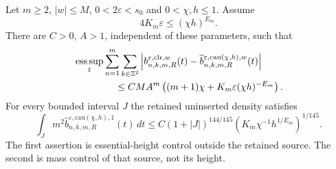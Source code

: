 \begin{theorem}
\label{thm:v63-positive-localization}
Let $m\ge2$, $|w|\le M$, $0<2\varepsilon<s_0$ and $0<\chi,h\le1$.
Assume
\begin{equation}\label{eq:v63-source-threshold}
 4K_m\varepsilon\le(\chi h)^{E_m}.
\end{equation}
There are $C>0$, $A>1$, independent of these parameters, such that
\begin{align}\label{eq:v63-height-outside}
 &\operatorname*{ess\,sup}_t\sum_{n=1}^m\sum_{k\in\Z^2}
 \left|b^{\varepsilon,\mathrm{clr},w}_{n,k,m,R}(t)
       -\widehat b^{\varepsilon,\mathrm{cau}(\chi,h),w}_{n,k,m,R}(t)\right|
 \notag\\
 &\hspace{15mm}\le CMA^m\left((m+1)\chi+
                  K_m\varepsilon(\chi h)^{-E_m}\right).
\end{align}
For every bounded interval $J$ the retained uninserted density satisfies
\begin{equation}\label{eq:v63-mass-inside}
 \int_J m^2\widehat b^{\varepsilon,\mathrm{cau}(\chi,h),1}_{n,k,m,R}(t)\,dt
 \le C(1+|J|)^{144/145}
                  \left(K_m\chi^{-1}h^{1/E_m}\right)^{1/145}.
\end{equation}
The first assertion is essential-height control outside the retained
source. The second is mass control of that source, not its height.
\end{theorem}
